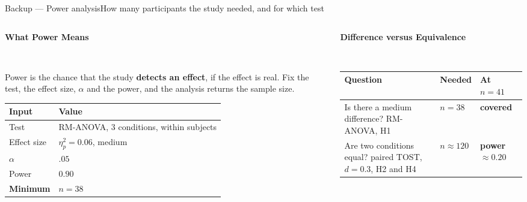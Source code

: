 \documentclass[aspectratio=169,10pt]{beamer}
\newcommand{\hl}[1]{{\color{knblue}\textbf{#1}}}
\newcommand{\good}[1]{{\color{kngreen}\textbf{#1}}}
\newcommand{\bad}[1]{{\color{knred}\textbf{#1}}}
\newcommand{\panelheadsm}[1]{\noindent\colorbox{kncyan}{\parbox{0.96\textwidth}{\centering\vspace{1pt}\color{white}\tiny\bfseries #1\vspace{1pt}}}\\[0.2em]}
\begin{document}
\begin{frame}{Backup — Power analysis}{How many participants the study needed, and for which test}
  \vspace{-0.2em}
  \begin{columns}[T,onlytextwidth]
    \begin{column}{0.48\textwidth}
      \panelheadsm{What Power Means}
      \noindent\colorbox{knlight}{\parbox{0.96\textwidth}{\vspace{3pt}\scriptsize\raggedright
        Power is the chance that the study \hl{detects an effect}, if the effect is real. Fix the test, the effect size, $\alpha$ and the power, and the analysis returns the sample size.\vspace{3pt}}}
      \vspace{0.4em}

      {\centering\scriptsize\setlength{\tabcolsep}{4pt}\renewcommand{\arraystretch}{1.25}
      \begin{tabular}{@{}>{\raggedright\arraybackslash}m{}>{\raggedright\arraybackslash}m{}@{}}
        \toprule
        \textbf{Input} & \textbf{Value} \\
        \midrule
        Test & RM-ANOVA, 3 conditions, within subjects \\
        Effect size & $\eta^2_p=0.06$, medium \\
        $\alpha$ & $.05$ \\
        Power & $0.90$ \\
        \midrule
        \textbf{Minimum} & \hl{$n=38$} \\
        \bottomrule
      \end{tabular}\par}
    \end{column}
    \begin{column}{0.48\textwidth}
      \panelheadsm{Difference versus Equivalence}
      {\centering\scriptsize\setlength{\tabcolsep}{4pt}\renewcommand{\arraystretch}{1.3}
      \begin{tabular}{@{}>{\raggedright\arraybackslash}m{}>{\raggedright\arraybackslash}m{}>{\raggedright\arraybackslash}m{}@{}}
        \toprule
        \textbf{Question} & \textbf{Needed} & \textbf{At $n=41$} \\
        \midrule
        Is there a medium difference? \newline RM-ANOVA, H1 & $n=38$ & \good{covered} \\
        Are two conditions equal? \newline paired TOST, $d=0.3$, H2 and H4 & $n\approx120$ & \bad{power $\approx0.20$} \\

\end{tabular}}
\end{column}
\end{columns}
\end{frame}
\end{document}
